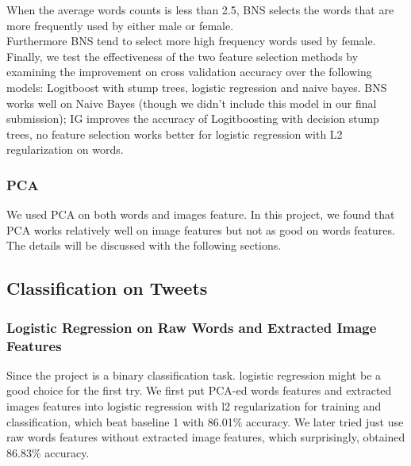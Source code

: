 When the average words counts is less than 2.5, BNS selects the words that are more frequently used by either male or female.\\
Furthermore BNS tend to select more high frequency words used by female.\\
Finally, we test the effectiveness of the two feature selection methods by examining the improvement on cross validation accuracy over the following models: Logitboost with stump trees, logistic regression and naive bayes.
BNS works well on Naive Bayes (though we didn't include this model in our final submission); IG improves the accuracy of Logitboosting with decision stump trees, no feature selection works better for logistic regression with L2 regularization on words.\\
\subsubsection{PCA}
We used PCA on both words and images feature. In this project, we found that PCA works relatively well on image features but not as good on words features. The details will be discussed with the following sections.

\subsection{Classification on Tweets}

\subsubsection{Logistic Regression on Raw Words and Extracted Image Features}
Since the project is a binary classification task. logistic regression might be a good choice for the first try. We first put PCA-ed words features and extracted images features into logistic regression with l2 regularization for training and classification, which beat baseline 1 with 86.01\% accuracy. We later tried just use raw words features without extracted image features, which surprisingly, obtained 86.83\% accuracy. 
